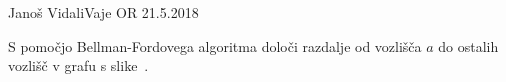 \begin{naloga}{Janoš Vidali}{Vaje OR 21.5.2018}
\begin{vprasanje}
S pomočjo Bellman-Fordovega algoritma
določi razdalje od vozlišča $a$ do ostalih vozlišč
v grafu s slike~\fig.

\begin{slika}
\pgfslika
{}
\end{slika}
\end{vprasanje}
\begin{odgovor}
\end{odgovor}
\end{naloga}
